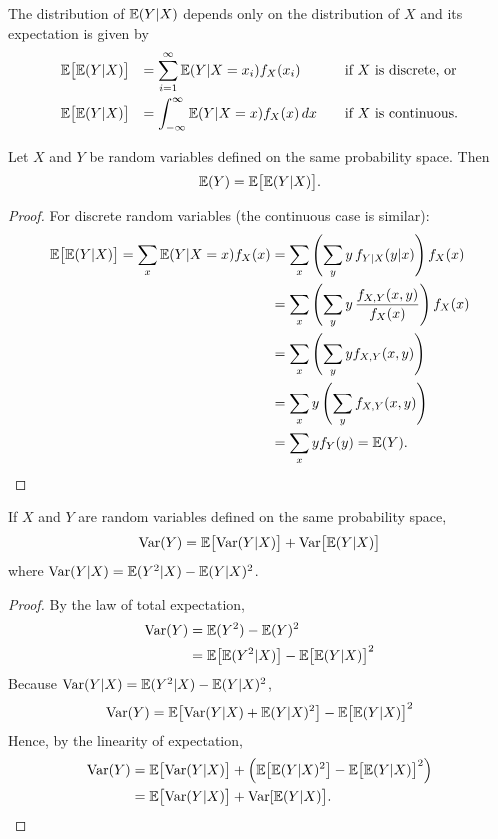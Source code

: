 The distribution of $\mathbb{E}(Y|X)$ depends only on the distribution of $X$ and its expectation is given by
\[
\begin{array}{lll}
\mathbb{E}\big[\mathbb{E}(Y|X)\big] & = \displaystyle\sum_{i=1}^{\infty}\mathbb{E}(Y|X=x_i)f_X(x_i)		& \quad\text{if $X$ is discrete, or} \\[3ex]
\mathbb{E}\big[\mathbb{E}(Y|X)\big] & = \displaystyle\int_{-\infty}^{\infty} \mathbb{E}(Y|X=x)f_X(x)\,dx	& \quad\text{if $X$ is continuous.} 
\end{array}
\]

\begin{theorem}
Let $X$ and $Y$ be random variables defined on the same probability space. Then
\[
\mathbb{E}(Y) = \mathbb{E}\big[\mathbb{E}(Y|X)\big].
\]
\end{theorem}
\begin{proof}
For discrete random variables (the continuous case is similar):
\begin{align*}
\mathbb{E}\big[\mathbb{E}(Y|X)\big] 
	= \sum_x \mathbb{E}(Y|X=x) f_X(x) 
	& = \sum_x\left(\sum_y y\,f_{Y|X}(y|x)\right) f_X(x) \\
	& = \sum_x\left(\sum_y y\,\frac{f_{X,Y}(x,y)}{f_X(x)}\right) f_X(x) \\
	& = \sum_x\left(\sum_y y f_{X,Y}(x,y)\right) \\
	& = \sum_x y \left(\sum_y f_{X,Y}(x,y)\right) \\
	& = \sum_x y f_Y(y)  
	= \mathbb{E}(Y).
\end{align*}
\end{proof}

\begin{theorem}
If $X$ and $Y$ are random variables defined on the same probability space,
\[
\text{Var}(Y) = \mathbb{E}\big[\text{Var}(Y|X)\big] + \text{Var}\big[\mathbb{E}(Y|X)\big] 
\]
where $\text{Var}(Y|X)=\mathbb{E}(Y^2|X) - \mathbb{E}(Y|X)^2$.
\end{theorem}
\begin{proof}
By the law of total expectation,
\begin{align*}
\text{Var}(Y)
	& = \mathbb{E}(Y^2) - \mathbb{E}(Y)^2 \\
	& = \mathbb{E}\big[\mathbb{E}(Y^2|X)\big] - \mathbb{E}\big[\mathbb{E}(Y|X)\big]^2
\end{align*}
Because $\text{Var}(Y|X)=\mathbb{E}(Y^2|X) - \mathbb{E}(Y|X)^2$,
\[
\text{Var}(Y) = \mathbb{E}\big[\text{Var}(Y|X) + \mathbb{E}(Y|X)^2\big] - \mathbb{E}\big[\mathbb{E}(Y|X)\big]^2
\]
Hence, by the linearity of expectation,
\begin{align*}
\text{Var}(Y)
	& = \mathbb{E}\big[\text{Var}(Y|X)\big] + \Big(\mathbb{E}\big[\mathbb{E}(Y|X)^2\big] - \mathbb{E}\big[\mathbb{E}(Y|X)\big]^2\Big) \\
	& = \mathbb{E}\big[\text{Var}(Y|X)\big] + \text{Var}[\mathbb{E}(Y|X)\big].
\end{align*}
\end{proof}

